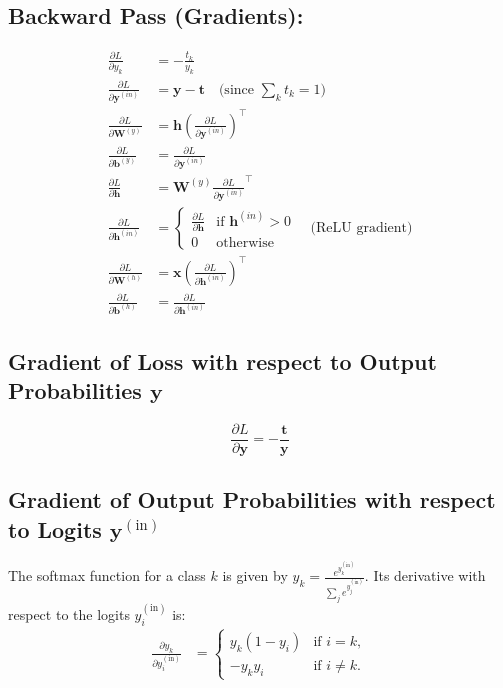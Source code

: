 \documentclass[11pt]{article}
\begin{document}
\subsection*{Backward Pass (Gradients):}
\begin{align*}
\frac{\partial L}{\partial y_k} &= -\frac{t_k}{y_k} \\
\frac{\partial L}{\partial \mathbf{y}^{(in)}} &= \mathbf{y} - \mathbf{t} \quad \text{(since } \sum_k t_k = 1 \text{)} \\
\frac{\partial L}{\partial \mathbf{W}^{(y)}} &= \mathbf{h} \left(\frac{\partial L}{\partial \mathbf{y}^{(in)}}\right)^\top \\
\frac{\partial L}{\partial \mathbf{b}^{(y)}} &= \frac{\partial L}{\partial \mathbf{y}^{(in)}} \\
\frac{\partial L}{\partial \mathbf{h}} &= \mathbf{W}^{(y)} \frac{\partial L}{\partial \mathbf{y}^{(in)}}^\top \\
\frac{\partial L}{\partial \mathbf{h}^{(in)}} &= \begin{cases}
\frac{\partial L}{\partial \mathbf{h}} & \text{if } \mathbf{h}^{(in)} > 0 \\
0 & \text{otherwise}
\end{cases} \quad \text{(ReLU gradient)} \\
\frac{\partial L}{\partial \mathbf{W}^{(h)}} &= \mathbf{x} \left(\frac{\partial L}{\partial \mathbf{h}^{(in)}}\right)^\top \\
\frac{\partial L}{\partial \mathbf{b}^{(h)}} &= \frac{\partial L}{\partial \mathbf{h}^{(in)}}
\end{align*}

\subsection*{Gradient of Loss with respect to Output Probabilities \( \mathbf{y} \)}
\begin{equation*}
\frac{\partial L}{\partial \mathbf{y}} = - \frac{\mathbf{t}}{\mathbf{y}}
\end{equation*}

\subsection*{Gradient of Output Probabilities with respect to Logits \( \mathbf{y}^{(\text{in})} \)}
The softmax function for a class \( k \) is given by \( y_k = \frac{e^{y^{(\text{in})}_k}}{\sum_j e^{y^{(\text{in})}_j}} \). Its derivative with respect to the logits \( y^{(\text{in})}_i \) is:
\begin{align*}
\frac{\partial y_k}{\partial y^{(\text{in})}_i} &= \begin{cases}
y_k (1 - y_i) & \text{if } i = k, \\
-y_k y_i & \text{if } i \neq k.
\end{cases}
\end{align*}
\end{document}

